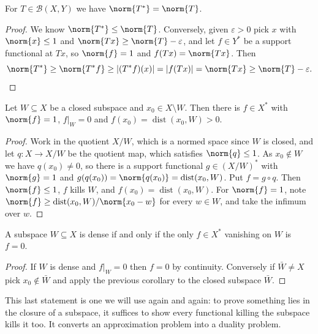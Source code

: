 \documentclass[a4paper]{scrartcl}
\newcommand{\Bop}{\mathcal{B}}
\DeclareMathOperator{\dist}{dist}
\begin{document}
\begin{corollary}
	For $T \in \Bop(X,Y)$ we have $\norm{T^*} = \norm{T}$.
\end{corollary}

\begin{proof}
	We know $\norm{T^*} \leq \norm{T}$. Conversely, given $\varepsilon > 0$ pick $x$ with $\norm{x} \leq 1$ and $\norm{Tx} \geq \norm{T} - \varepsilon$, and let $f \in Y^*$ be a support functional at $Tx$, so $\norm{f}=1$ and $f(Tx) = \norm{Tx}$. Then
	$$\norm{T^*} \geq \norm{T^*f} \geq |(T^*f)(x)| = |f(Tx)| = \norm{Tx} \geq \norm{T} - \varepsilon. \qedhere$$
\end{proof}

\begin{corollary}
	Let $W \subseteq X$ be a closed subspace and $x_0 \in X \setminus W$. Then there is $f \in X^*$ with $\norm{f} = 1$, $f|_W = 0$ and $f(x_0) = \dist(x_0, W) > 0$.
\end{corollary}

\begin{proof}
	Work in the quotient $X/W$, which is a normed space since $W$ is closed, and let $q : X \to X/W$ be the quotient map, which satisfies $\norm{q} \leq 1$. As $x_0 \notin W$ we have $q(x_0) \neq 0$, so there is a support functional $g \in (X/W)^*$ with $\norm{g}=1$ and $g(q(x_0)) = \norm{q(x_0)} = \dist(x_0, W)$. Put $f = g \circ q$. Then $\norm{f} \leq 1$, $f$ kills $W$, and $f(x_0) = \dist(x_0,W)$. For $\norm{f} = 1$, note $\norm{f} \geq \dist(x_0,W)/\norm{x_0 - w}$ for every $w \in W$, and take the infimum over $w$.
\end{proof}

\begin{corollary}
	A subspace $W \subseteq X$ is dense if and only if the only $f \in X^*$ vanishing on $W$ is $f = 0$.
\end{corollary}

\begin{proof}
	If $W$ is dense and $f|_W = 0$ then $f = 0$ by continuity. Conversely if $\bar W \neq X$ pick $x_0 \notin \bar W$ and apply the previous corollary to the closed subspace $\bar W$.
\end{proof}

This last statement is one we will use again and again: to prove something lies in the closure of a subspace, it suffices to show every functional killing the subspace kills it too. It converts an approximation problem into a duality problem.
\end{document}
